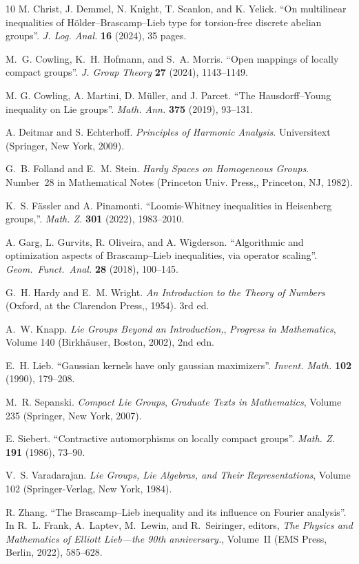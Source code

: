 \documentclass[12pt,twoside,a4paper]{amsart}
\theoremstyle{definition}
\theoremstyle{remark}
\numberwithin{equation}{section}
\begin{document}
\begin{thebibliography}{10}
M. Christ, J. Demmel, N. Knight, T. Scanlon, and K. Yelick.
\enquote{On multilinear inequalities of {H}ölder--{B}rascamp--{L}ieb
  type for torsion-free discrete abelian groups}.
\emph{J. Log. Anal.} \textbf{ 16} (2024), 35 pages.

M.~G. Cowling, K.~H. Hofmann, and S.~A. Morris.
\enquote{Open mappings of locally compact groups}.
\emph{J. Group Theory} \textbf{ 27} (2024), 1143--1149.

M. G. Cowling, A. Martini, D. Müller, and J. Parcet.
\enquote{The {H}ausdorff--{Y}oung inequality on {L}ie groups}.
\emph{Math. Ann.} \textbf{ 375} (2019), 93--131.

A. Deitmar and S. Echterhoff.
\emph{Principles of {H}armonic {A}nalysis}.
Universitext (Springer, New York, 2009).

G.~B. Folland and E.~M. Stein.
\emph{Hardy Spaces on Homogeneous Groups}.
Number~28 in Mathematical Notes (Princeton Univ. Press,, Princeton,
  NJ, 1982).

K.~S. Fässler and A. Pinamonti.
\enquote{Loomis-{W}hitney inequalities in {H}eisenberg groups,}.
\emph{Math. Z.} \textbf{ 301} (2022), 1983--2010.

A. Garg, L. Gurvits, R. Oliveira, and A. Wigderson.
\enquote{Algorithmic and optimization aspects of {B}rascamp--{L}ieb
  inequalities, via operator scaling}.
\emph{Geom.~Funct.~Anal.} \textbf{ 28} (2018), 100--145.

G.~H. Hardy and E.~M. Wright.
\emph{An {I}ntroduction to the {T}heory of {N}umbers} (Oxford, at the
  Clarendon Press,, 1954).
3rd ed.

A.~W. Knapp.
\emph{Lie {G}roups {B}eyond an {I}ntroduction,}, \emph{Progress in
  Mathematics}, Volume 140 (Birkhäuser, Boston, 2002), 2nd edn.

E.~H. Lieb.
\enquote{Gaussian kernels have only gaussian maximizers}.
\emph{Invent. Math.} \textbf{ 102} (1990), 179--208.

M.~R. Sepanski.
\emph{Compact {L}ie {G}roups}, \emph{Graduate Texts in Mathematics},
  Volume 235 (Springer, New York, 2007).

E. Siebert.
\enquote{Contractive automorphisms on locally compact groups}.
\emph{Math. Z.} \textbf{ 191}  (1986), 73--90.

V.~S. Varadarajan.
\emph{Lie {G}roups, {L}ie {A}lgebras, and {T}heir {R}epresentations},
  Volume 102 (Springer-Verlag, New York, 1984).

R. Zhang.
\enquote{The {B}rascamp--{L}ieb inequality and its influence on
  {F}ourier analysis}.
In R.~L. Frank, A.~Laptev, M.~Lewin, and R.~Seiringer, editors,
  \emph{The {P}hysics and {M}athematics of {E}lliott {L}ieb---the 90th
  anniversary.}, Volume~II (EMS Press, Berlin, 2022), 585--628.

\end{thebibliography}
\end{document}
